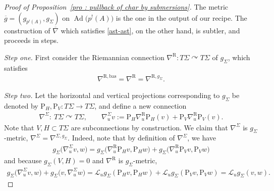 \documentclass[11pt]{article}
\numberwithin{equation}{section}
\newcommand{\acts}{\curvearrowright}
\newcommand{\8}{\infty}
\begin{document}
\begin{proof}[Proof of Proposition~\ref{pro : pullback of char by submersions}]
 The metric $\overline{g}=(g_{p^!(A)},g_{\Sigma})$ on $\operatorname{Ad}\big(p^!(A)\big)$ is the one in the output of our recipe. The construction of $\overline{\nabla}$ which satisfies \eqref{ast-ast}, on the other hand, is subtler, and proceeds in steps.

{\it Step one.} First consider the Riemannian connection $\nabla^{\mathrm{R}}\colon T\Sigma \acts T\Sigma$ of $g_{\Sigma}$, which satisfies
 \begin{gather*}
 \nabla^{\mathrm{R},\mathrm{bas}} = \nabla^{\mathrm{R}} = \nabla^{\mathrm{R},g_{\Sigma}}.
 \end{gather*}

{\it Step two.} Let the horizontal and vertical projections corresponding to $g_{\Sigma}$ be denoted by $\mathrm{P}_H,\mathrm{P}_V\colon T\Sigma \to T\Sigma $, and define a new connection
 \begin{gather*}
 \nabla^{\Sigma}\colon \ T\Sigma \acts T\Sigma, \qquad \nabla^{\Sigma}_uv:=\mathrm{P}_H\nabla^{\mathrm{R}}_u\mathrm{P}_H(v) + \mathrm{P}_V\nabla^{\mathrm{R}}_u\mathrm{P}_V(v).
 \end{gather*}Note that $V,H \subset T\Sigma$ are subconnections by construction. We claim that $\nabla^{\Sigma}$ is $g_{\Sigma}$-metric, $\nabla^{\Sigma} = \nabla^{\Sigma,g_{\Sigma}}$. Indeed, note that by definition of $\nabla^{\Sigma}$, we have
 \begin{gather*}
 g_{\Sigma}\big(\nabla^{\Sigma}_uv,w\big) = g_{\Sigma}\big(\nabla^{\mathrm{R}}_u\mathrm{P}_Hv,\mathrm{P}_Hw\big) + g_{\Sigma}\big(\nabla^{\mathrm{R}}_u\mathrm{P}_Vv,\mathrm{P}_Vw\big)
 \end{gather*}and because $g_{\Sigma}(V,H)=0$ and $\nabla^{\mathrm{R}}$ is $g_{\Sigma}$-metric,
 \begin{gather*}
 g_{\Sigma}\big(\nabla^{\Sigma}_uv,w\big) + g_{\Sigma}\big(v,\nabla^{\Sigma}_uw\big) = \mathscr{L}_ug_{\Sigma}(\mathrm{P}_Hv,\mathrm{P}_Hw) + \mathscr{L}_ug_{\Sigma}(\mathrm{P}_Vv,\mathrm{P}_Vw) = \mathscr{L}_ug_{\Sigma}(v,w).
 \end{gather*}


\end{proof}
\end{document}
